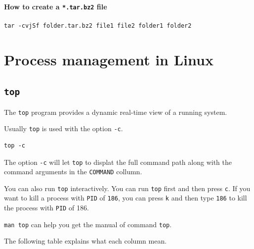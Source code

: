 \documentclass[]{book}
\begin{document}
\hypertarget{how-to-create-a-.tar.bz2-file}{%
\subsubsection{\texorpdfstring{How to create a \texttt{*.tar.bz2} file}{How to create a *.tar.bz2 file}}\label{how-to-create-a-.tar.bz2-file}}

\begin{verbatim}
tar -cvjSf folder.tar.bz2 file1 file2 folder1 folder2
\end{verbatim}

\hypertarget{process-management-in-linux}{%
\chapter{Process management in Linux}\label{process-management-in-linux}}

\hypertarget{top}{%
\section{\texorpdfstring{\texttt{top}}{top}}\label{top}}

The \texttt{top} program provides a dynamic real-time view of a running system.

Usually \texttt{top} is used with the option \texttt{-c}.

\begin{verbatim}
top -c
\end{verbatim}

The option \texttt{-c} will let \texttt{top} to displat the full command path along with the command arguments in the \texttt{COMMAND} collumn.

You can also run \texttt{top} interactively. You can run \texttt{top} first and then press \texttt{c}. If you want to kill a process with \texttt{PID} of \texttt{186}, you can press \texttt{k} and then type \texttt{186} to kill the process with \texttt{PID} of 186.

\texttt{man\ top} can help you get the manual of command \texttt{top}.

The following table explains what each column mean.
\end{document}
